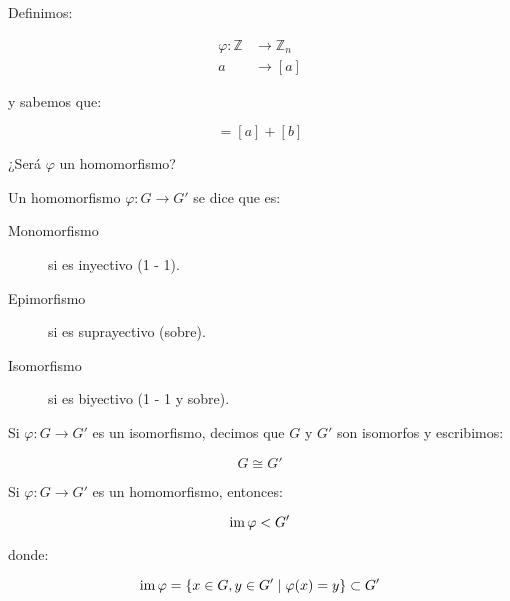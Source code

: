         \begin{ejercicio}
            Definimos:

            \begin{align*}
                \varphi \colon \mathbb{Z} &\to \mathbb{Z}_n \\
                a &\to [a]
            \end{align*}

            y sabemos que:

            \begin{equation*}
                [a + b] = [a] + [b]
            \end{equation*}

            ¿Será $\varphi$ un homomorfismo?
        \end{ejercicio}

        \begin{definicion}
            Un homomorfismo $\varphi \colon G \to G'$ se dice que es:

            \begin{description}
                \item[Monomorfismo] si es inyectivo (1 - 1).
                \item[Epimorfismo] si es suprayectivo (sobre).
                \item[Isomorfismo] si es biyectivo (1 - 1 y sobre).
            \end{description}
        \end{definicion}

        \begin{definicion}
            Si $\varphi \colon G \to G'$ es un isomorfismo, decimos que $G$ y $G'$ son isomorfos y escribimos:

            \begin{equation}
                G \cong G'
            \end{equation}
        \end{definicion}

        \begin{proposicion}
            Si $\varphi \colon G \to G'$ es un homomorfismo, entonces:

            \begin{equation}
                \operatorname{im}{\varphi} < G'
            \end{equation}

            donde:

            \begin{equation}
                \operatorname{im}{\varphi} = \left\{ x \in G, y \in G' \mid \varphi(x) = y \right\} \subset G'
            \end{equation}
        \end{proposicion}

